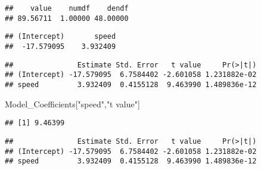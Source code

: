 \documentclass[
]{article}
\newenvironment{Shaded}{\begin{snugshade}}{\end{snugshade}}
\newcommand{\KeywordTok}[1]{\textcolor[rgb]{0.13,0.29,0.53}{\textbf{#1}}}
\newcommand{\NormalTok}[1]{#1}
\newcommand{\OperatorTok}[1]{\textcolor[rgb]{0.81,0.36,0.00}{\textbf{#1}}}
\newcommand{\StringTok}[1]{\textcolor[rgb]{0.31,0.60,0.02}{#1}}
\begin{document}
\begin{verbatim}
##    value    numdf    dendf 
## 89.56711  1.00000 48.00000
\end{verbatim}

\begin{Shaded}
\end{Shaded}

\begin{verbatim}
## (Intercept)       speed 
##  -17.579095    3.932409
\end{verbatim}

\begin{Shaded}
\end{Shaded}

\begin{verbatim}
##               Estimate Std. Error   t value     Pr(>|t|)
## (Intercept) -17.579095  6.7584402 -2.601058 1.231882e-02
## speed         3.932409  0.4155128  9.463990 1.489836e-12
\end{verbatim}

\begin{Shaded}
\begin{Highlighting}[]
\NormalTok{Model_Coefficients[}\StringTok{"speed"}\NormalTok{,}\StringTok{"t value"}\NormalTok{]}
\end{Highlighting}
\end{Shaded}

\begin{verbatim}
## [1] 9.46399
\end{verbatim}

\begin{Shaded}
\end{Shaded}

\begin{verbatim}
##               Estimate Std. Error   t value     Pr(>|t|)
## (Intercept) -17.579095  6.7584402 -2.601058 1.231882e-02
## speed         3.932409  0.4155128  9.463990 1.489836e-12
\end{verbatim}
\end{document}
